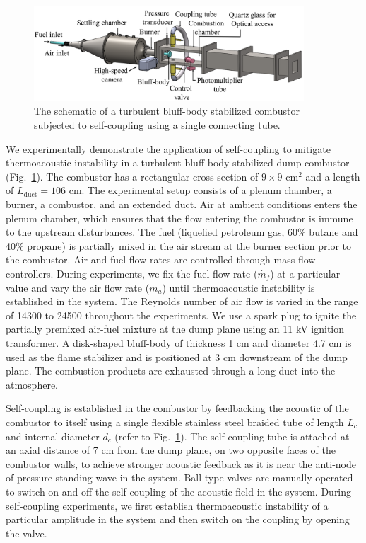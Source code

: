 \documentclass[%
preprint,
 amsmath,amssymb,
 aps,
 pra,
]{revtex4-2}
\begin{document}
\begin{figure}[t]
\centering
\includegraphics[width=0.9\textwidth]{fig1.png}
\caption{The schematic of a turbulent bluff-body stabilized combustor subjected to self-coupling using a single connecting tube.}
\label{TARA_fig}
\end{figure}
We experimentally demonstrate the application of self-coupling to mitigate thermoacoustic instability in a turbulent bluff-body stabilized dump combustor (Fig.~\ref{TARA_fig}). The combustor has a rectangular cross-section of $9 \times 9$ $\text{cm}^2$ and a length of $L_{\text{duct}} = 106$ $\text{cm}$. The experimental setup consists of a plenum chamber, a burner, a combustor, and an extended duct. Air at ambient conditions enters the plenum chamber, which ensures that the flow entering the combustor is immune to the upstream disturbances. The fuel (liquefied petroleum gas, 60\% butane and 40\% propane) is partially mixed in the air stream at the burner section prior to the combustor. Air and fuel flow rates are controlled through mass flow controllers. During experiments, we fix the fuel flow rate ($\dot{m_f}$) at a particular value and vary the air flow rate ($\dot{m_a}$) until thermoacoustic instability is established in the system. The Reynolds number of air flow is varied in the range of 14300 to 24500 throughout the experiments. We use a spark plug to ignite the partially premixed air-fuel mixture at the dump plane using an 11 kV ignition transformer. A disk-shaped bluff-body of thickness 1 cm and diameter 4.7 cm is used as the flame stabilizer and is positioned at 3 cm downstream of the dump plane. The combustion products are exhausted through a long duct into the atmosphere. 

Self-coupling is established in the combustor by feedbacking the acoustic of the combustor to itself using a single flexible stainless steel braided tube of length $L_c$ and internal diameter $d_c$ (refer to Fig.~\ref{TARA_fig}). The self-coupling tube is attached at an axial distance of 7 cm from the dump plane, on two opposite faces of the combustor walls, to achieve stronger acoustic feedback as it is near the anti-node of pressure standing wave in the system. Ball-type valves are manually operated to switch on and off the self-coupling of the acoustic field in the system. During self-coupling experiments, we first establish thermoacoustic instability of a particular amplitude in the system and then switch on the coupling by opening the valve.  
\end{document}
